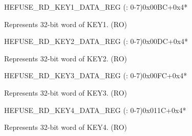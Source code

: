 \begin{register}{H}{EFUSE\_RD\_KEY1\_DATA\_REG (: 0-7)}{0x00BC+0x4*}\label{regdesc:EFUSERDKEY1DATANREG}
%
\regnewline%
\begin{regdesc}\begin{reglist}
\label{fielddesc:EFUSEKEY1DATAN}\item [EFUSE\_KEY1\_DATA\regindex{n}] Represents 32-bit word  of KEY1. (RO)
\end{reglist}\end{regdesc}
\end{register}


\begin{register}{H}{EFUSE\_RD\_KEY2\_DATA\_REG (: 0-7)}{0x00DC+0x4*}\label{regdesc:EFUSERDKEY2DATANREG}
%
\regnewline%
\begin{regdesc}\begin{reglist}
\label{fielddesc:EFUSEKEY2DATAN}\item [EFUSE\_KEY2\_DATA\regindex{n}] Represents 32-bit word  of KEY2. (RO)
\end{reglist}\end{regdesc}
\end{register}


\begin{register}{H}{EFUSE\_RD\_KEY3\_DATA\_REG (: 0-7)}{0x00FC+0x4*}\label{regdesc:EFUSERDKEY3DATANREG}
%
\regnewline%
\begin{regdesc}\begin{reglist}
\label{fielddesc:EFUSEKEY3DATAN}\item [EFUSE\_KEY3\_DATA\regindex{n}] Represents 32-bit word  of KEY3. (RO)
\end{reglist}\end{regdesc}
\end{register}


\begin{register}{H}{EFUSE\_RD\_KEY4\_DATA\_REG (: 0-7)}{0x011C+0x4*}\label{regdesc:EFUSERDKEY4DATANREG}
%
\regnewline%
\begin{regdesc}\begin{reglist}
\label{fielddesc:EFUSEKEY4DATAN}\item [EFUSE\_KEY4\_DATA\regindex{n}] Represents 32-bit word  of KEY4. (RO)
\end{reglist}\end{regdesc}
\end{register}


